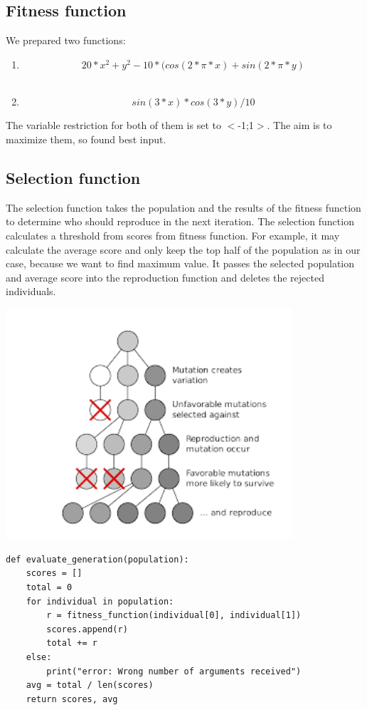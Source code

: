 \documentclass[a4paper, 12pt]{article}
\begin{document}
\subsection{Fitness function}

We prepared two functions:
\begin{enumerate}
	\item \[20*x^2 + y^2 - 10*(cos(2 * \pi * x) + sin(2 * \pi * y) \] \\
	\item \[sin(3*x) * cos(3*y) / 10\]
\end{enumerate}

The variable restriction for both of them is set to $<$-1;1$>$.
The aim is to maximize them, so found best input.

\subsection{Selection function}

The selection function takes the population and the results of the fitness function to determine who should reproduce in the next iteration. The selection function calculates a threshold from scores from fitness function. For example, it may calculate the average score and only keep the top half of the population as in our case, because we want to find maximum value. It passes the selected population and average score into the reproduction function and deletes the rejected individuals. 

\begin{center}
	\includegraphics[width=0.8\textwidth]{sel_function.png} 
\end{center}


\begin{lstlisting}
def evaluate_generation(population):
	scores = []
	total = 0
	for individual in population:
		r = fitness_function(individual[0], individual[1])
		scores.append(r)
		total += r
	else:
		print("error: Wrong number of arguments received")
	avg = total / len(scores)
	return scores, avg
\end{lstlisting}
\end{document}
